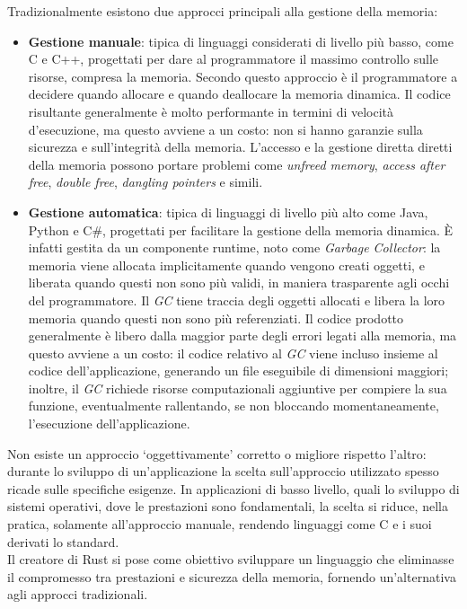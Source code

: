 Tradizionalmente esistono due approcci principali alla gestione della memoria:
\begin{itemize}
    \item \textbf{Gestione manuale}: tipica di linguaggi considerati di livello più basso, come C e C++, progettati per dare al programmatore il massimo controllo sulle risorse, compresa la memoria. Secondo questo approccio è il programmatore a decidere quando allocare e quando deallocare la memoria dinamica. Il codice risultante generalmente è molto performante in termini di velocità d'esecuzione, ma questo avviene a un costo: non si hanno garanzie sulla sicurezza e sull'integrità della memoria. L'accesso e la gestione diretta diretti della memoria possono portare problemi come \textit{unfreed memory}, \textit{access after free}, \textit{double free}, \textit{dangling pointers} e simili.
    \item \textbf{Gestione automatica}: tipica di linguaggi di livello più alto come Java, Python e C\#, progettati per facilitare la gestione della memoria dinamica. È infatti gestita da un componente runtime, noto come \textit{Garbage Collector}: la memoria viene allocata implicitamente quando vengono creati oggetti, e liberata quando questi non sono più validi, in maniera trasparente agli occhi del programmatore. Il \textit{GC} tiene traccia degli oggetti allocati e libera la loro memoria quando questi non sono più referenziati. Il codice prodotto generalmente è libero dalla maggior parte degli errori legati alla memoria, ma questo avviene a un costo: il codice relativo al \textit{GC} viene incluso insieme al codice dell'applicazione, generando un file eseguibile di dimensioni maggiori; inoltre, il \textit{GC} richiede risorse computazionali aggiuntive per compiere la sua funzione, eventualmente rallentando, se non bloccando momentaneamente, l'esecuzione dell'applicazione.
\end{itemize}
Non esiste un approccio `oggettivamente' corretto o migliore rispetto l'altro: durante lo sviluppo di un'applicazione 
la scelta sull'approccio utilizzato spesso ricade sulle specifiche esigenze.
In applicazioni di basso livello, quali lo sviluppo di sistemi operativi, dove le prestazioni sono fondamentali, la scelta si riduce, 
nella pratica, solamente all'approccio manuale, rendendo linguaggi come C e i suoi derivati lo standard.\hfill
\vspace{15pt}\\
Il creatore di Rust si pose come obiettivo sviluppare un linguaggio che eliminasse il compromesso tra prestazioni e sicurezza della memoria, fornendo un'alternativa agli approcci tradizionali.

